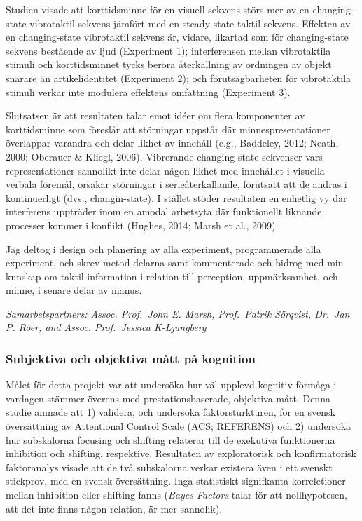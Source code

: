 \documentclass[]{article}
\begin{document}
Studien visade att korttidsminne för en visuell sekvens störs mer av en
changing-state vibrotaktil sekvens jämfört med en steady-state taktil
sekvens. Effekten av en changing-state vibrotaktil sekvens är, vidare,
likartad som för changing-state sekvens bestående av ljud (Experiment
1); interferensen mellan vibrotaktila stimuli och korttidsminnet tycks
beröra återkallning av ordningen av objekt snarare än artikelidentitet
(Experiment 2); och förutsägbarheten för vibrotaktila stimuli verkar
inte modulera effektens omfattning (Experiment 3).

Slutsatsen är att resultaten talar emot idéer om flera komponenter av
korttidsminne som föreslår att störningar uppstår där
minnespresentationer överlappar varandra och delar likhet av innehåll
(e.g., Baddeley, 2012; Neath, 2000; Oberauer \& Kliegl, 2006).
Vibrerande changing-state sekvenser vars representationer sannolikt inte
delar någon likhet med innehållet i visuella verbala föremål, orsakar
störningar i serieåterkallande, förutsatt att de ändras i kontinuerligt
(dvs., changin-state). I stället stöder resultaten en enhetlig vy där
interferens uppträder inom en amodal arbetsyta där funktionellt liknande
processer kommer i konflikt (Hughes, 2014; Marsh et al., 2009).

Jag deltog i design och planering av alla experiment, programmerade alla
experiment, och skrev metod-delarna samt kommenterade och bidrog med min
kunskap om taktil information i relation till perception, uppmärksamhet,
och minne, i senare delar av manus.

\emph{Samarbetspartners: Assoc. Prof.~John E. Marsh, Prof.~Patrik
Sörqvist, Dr.~Jan P. Röer, and Assoc. Prof.~Jessica K-Ljungberg}

\subsubsection{Subjektiva och objektiva mått på
kognition}\label{subjektiva-och-objektiva-matt-pa-kognition}

Målet för detta projekt var att undersöka hur väl upplevd kognitiv
förmåga i vardagen stämmer överens med prestationsbaserade, objektiva
mått. Denna studie ämnade att 1) validera, och undersöka
faktorsturkturen, för en svensk översättning av Attentional Control
Scale (ACS; REFERENS) och 2) undersöka hur subskalorna focusing och
shifting relaterar till de exekutiva funktionerna inhibition och
shifting, respektive. Resultaten av exploratorisk och konfirmatorisk
faktoranalys visade att de två subskalorna verkar existera även i ett
svenskt stickprov, med en svensk översättning. Inga statistiskt
signifkanta korreletioner mellan inhibition eller shifting fanns
(\emph{Bayes Factors} talar för att nollhypotesen, att det inte finns
någon relation, är mer sannolik).
\end{document}
